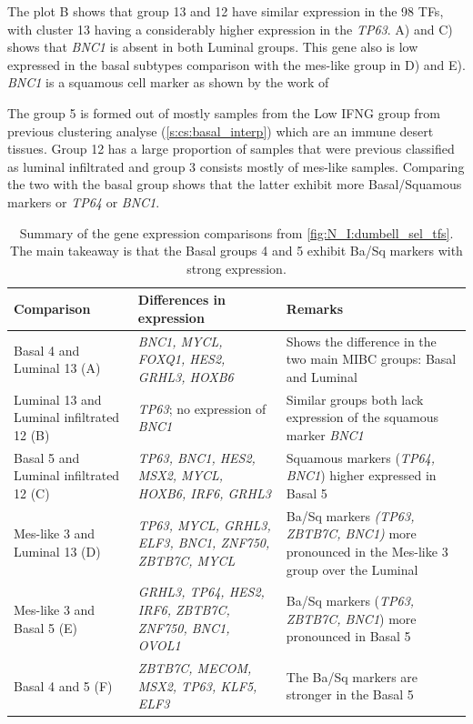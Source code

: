The plot B shows that group 13 and 12 have similar expression in the 98 TFs, with cluster 13 having a considerably higher expression in the \textit{TP63}.  A) and C) shows that \textit{BNC1} is absent in both Luminal groups. This gene also is low expressed in the basal subtypes comparison with the mes-like group in D) and E). \textit{BNC1} is a squamous cell marker as shown by the work of \citet{Hurst2022-sp}

The group 5 is formed out of mostly samples from the Low IFNG group from previous clustering analyse (\cref{s:cs:basal_interp}) which are an immune desert tissues. Group 12 has a large proportion of samples that were previous classified as luminal infiltrated and group 3 consists mostly of mes-like samples. Comparing the two with the basal group shows that the latter exhibit more Basal/Squamous markers or \textit{TP64} or \textit{BNC1}.

\begin{table}[!t]
    \centering
    \scriptsize
    \begin{tabularx}{\textwidth}{>{\hsize=0.8\hsize}X|>{\hsize=0.8\hsize}X|>{\hsize=1.4\hsize}X}
        \toprule
        \textbf{Comparison} & \textbf{Differences in expression} & \textbf{Remarks} \\
        \midrule
        Basal 4 and Luminal 13 (A) & \textit{BNC1, MYCL, FOXQ1, HES2, GRHL3, HOXB6} & Shows the difference in the two main MIBC groups: Basal and Luminal \\
        \midrule
        Luminal 13 and Luminal infiltrated 12 (B) & \textit{TP63}; no expression of \textit{BNC1} & Similar groups both lack expression of the squamous marker \textit{BNC1} \\
        \midrule
        Basal 5 and Luminal infiltrated 12 (C) & \textit{TP63, BNC1, HES2, MSX2, MYCL, HOXB6, IRF6, GRHL3} & Squamous markers (\textit{TP64, BNC1}) higher expressed in Basal 5 \\
        \midrule
        Mes-like 3 and Luminal 13 (D) & \textit{TP63, MYCL, GRHL3, ELF3, BNC1, ZNF750, ZBTB7C, MYCL} & Ba/Sq markers \textit{(TP63, ZBTB7C, BNC1)} more pronounced in the Mes-like 3 group over the Luminal \\
        \midrule
        Mes-like 3 and  Basal 5 (E) & \textit{GRHL3, TP64, HES2, IRF6, ZBTB7C, ZNF750, BNC1, OVOL1} & Ba/Sq markers (\textit{TP63, ZBTB7C, BNC1}) more pronounced in Basal 5 \\
        \midrule
        Basal 4 and 5 (F) & \textit{ZBTB7C, MECOM, MSX2, TP63, KLF5, ELF3} & The Ba/Sq markers are stronger in the Basal 5 \\
        \bottomrule
    \end{tabularx}
    \caption{Summary of the gene expression comparisons from \cref{fig:N_I:dumbell_sel_tfs}. The main takeaway is that the Basal groups 4 and 5 exhibit Ba/Sq markers with strong expression.}
    \label{tab:N_I:dumbel_summarry}
\end{table}

